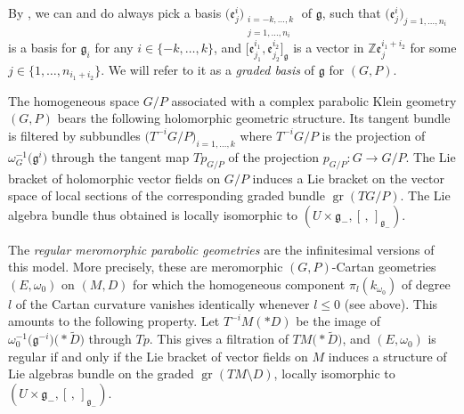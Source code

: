 \documentclass[pdftex]{sigma}
\numberwithin{equation}{section}
\begin{document}
 By \cite{Chevalley}, we can and do always pick a basis $\big(\mathfrak{e}^i_j\big)_{\substack{i=-k,\dots,k \\ j=1,\dots,n_i}}$ of $\mathfrak{g}$, such that $\big(\mathfrak{e}_j^i\big)_{j=1,\dots,n_i}$ is a basis for $\mathfrak{g}_i$ for any $i\in \{-k,\dots,k\}$, and $\big[\mathfrak{e}^{i_1}_{j_1},\mathfrak{e}^{i_2}_{j_2}\big]_\mathfrak{g}$ is a vector in $\mathbb{Z}\mathfrak{e}^{i_1+i_2}_{j}$ for some $j\in \{1,\dots,n_{i_1+i_2}\}$. We will refer to it as a \textit{graded basis} of $\mathfrak{g}$ for $(G,P)$.

 The homogeneous space $G/P$ associated with a complex parabolic Klein geometry $(G,P)$ bears the following holomorphic geometric structure. Its tangent bundle is filtered by subbundles $\big(T^{-i}G/P\big)_{i=1,\dots,k}$ where $T^{-i}G/P$ is the projection of $\omega_G^{-1}\big(\mathfrak{g}^i\big)$ through the tangent map $Tp_{G/P}$ of the projection $p_{G/P}\colon G \longrightarrow G/P$. The Lie bracket of holomorphic vector fields on $G/P$ induces a Lie bracket on the vector space of local sections of the corresponding graded bundle $\operatorname{gr}(TG/P)$. The Lie algebra bundle thus obtained is locally isomorphic to $(U\times \mathfrak{g}_-, [\,,\,]_{\mathfrak{g}_-})$.

 The \textit{regular meromorphic parabolic geometries} are the infinitesimal versions of this model. More precisely, these are meromorphic $(G,P)$-Cartan geometries $(E,\omega_0)$ on $(M,D)$ for which the homogeneous component $\pi_l(k_{\omega_0})$ of degree $l$ of the Cartan curvature vanishes identically whenever $l\leq 0$ (see above). This amounts to the following property. Let $T^{-i}M(* D)$ be the image of $\omega_0^{-1}\big(\mathfrak{g}^{-i}\big)\bigl(* \tilde{D}\bigr)$ through $Tp$. This gives a filtration of $TM\bigl(* \tilde{D}\bigr)$, and $(E,\omega_0)$ is regular if and only if the Lie bracket of vector fields on $M$ induces a structure of Lie algebras bundle on the graded $\operatorname{gr}(TM\setminus D)$, locally isomorphic to $(U\times \mathfrak{g}_-,[\,,\,]_{\mathfrak{g}_-})$.
\end{document}
